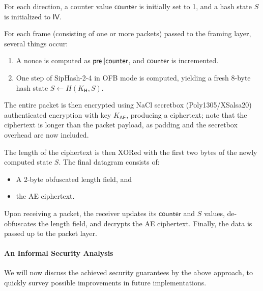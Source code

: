 For each direction, a counter value $\mathsf{counter}$ is initially set to 1, and a hash state $S$ is initialized to $\mathsf{IV}$.

For each frame (consisting of one or more packets) passed to the framing layer, several things occur:
\begin{enumerate}
    \item A nonce is computed as $ \mathsf{pre} \| \mathsf{counter}$, and $\mathsf{counter}$ is incremented.
    \item One step of SipHash-2-4 in OFB mode is computed, yielding a fresh 8-byte hash state $S \gets H(K_\mathsf{H}, S)$.
\end{enumerate}

The entire packet is then encrypted using NaCl secretbox (Poly1305/XSalsa20) authenticated encryption with key $K_\mathsf{AE}$, producing a ciphertext; note that the ciphertext is longer than the packet payload, as padding and the secretbox overhead are now included.

The length of the ciphertext is then XORed with the first two bytes of the newly computed state $S$. The final datagram consists of:
\begin{itemize}
    \item A 2-byte obfuscated length field, and
    \item the AE ciphertext.
\end{itemize}

Upon receiving a packet, the receiver updates its $\mathsf{counter}$ and $S$ values, de-obfuscates the length field, and decrypts the AE ciphertext. Finally, the data is passed up to the packet layer.

\paragraph{An Informal Security Analysis}

We will now discuss the achieved security guarantees by the above approach, to quickly survey possible improvements in future implementations.

